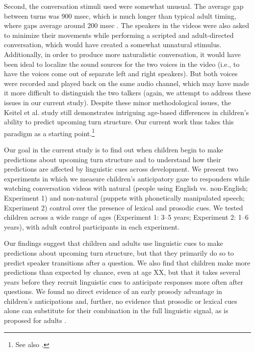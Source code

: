 \documentclass[authoryear, 12pt]{elsarticle}
\begin{document}
Second, the conversation stimuli \citet{keitel2013} used were somewhat unusual. The average gap between turns was 900 msec, which is much longer than typical adult timing, where gaps average around 200 msec \citep{stivers2009}. The speakers in the videos were also asked to minimize their movements while performing a scripted and adult-directed conversation, which would have created a somewhat unnatural stimulus. Additionally, in order to produce more naturalistic conversation, it would have been ideal to localize the sound sources for the two voices in the video (i.e., to have the voices come out of separate left and right speakers). But both voices were recorded and played back on the same audio channel, which may have made it more difficult to distinguish the two talkers (again, we attempt to address these issues in our current study). Despite these minor methodological issues, the Keitel et al. \citeyearpar{keitel2013} study still demonstrates intriguing age-based differences in children's ability to predict upcoming turn structure. Our current work thus takes this paradigm as a starting point.\footnote{See also \citet{casillas2012, casillas2013}.} 

Our goal in the current study is to find out when children begin to make predictions about upcoming turn structure and to understand how their predictions are affected by linguistic cues across development. We present two experiments in which we measure children's anticipatory gaze to responders while watching conversation videos with natural (people using English vs. non-English; Experiment 1) and non-natural (puppets with phonetically manipulated speech; Experiment 2) control over the presence of lexical and prosodic cues. We tested children across a wide range of ages (Experiment 1: 3--5 years; Experiment 2: 1--6 years), with adult control participants in each experiment.

Our findings suggest that children and adults use linguistic cues to make predictions about upcoming turn structure, but that they primarily do so to predict speaker transitions after a question. We also find that children make more predictions than  expected by chance, even at age XX, but that it takes several years before they recruit linguistic cues to anticipate responses more often after questions. We found no direct evidence of an early prosody advantage in children's anticipations and, further, no evidence that prosodic or lexical cues alone can substitute for their combination in the full linguistic signal, as is proposed for adults \citep{de-ruiter2006}.
\end{document}
